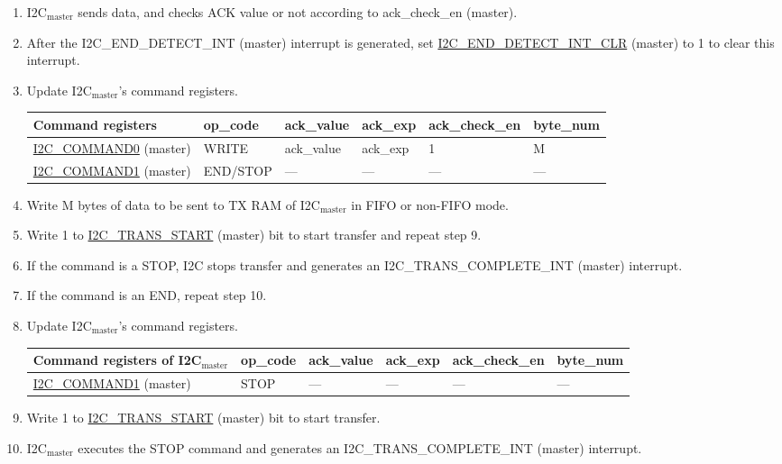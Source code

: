 \documentclass[main\_\_EN.tex]{subfiles}
\begin{document}
\begin{enumerate}
\item I2C$_\text{master}$ sends data, and checks ACK value or not according to ack\_check\_en (master).

\item After the I2C\_END\_DETECT\_INT (master) interrupt is generated, set \hyperref[fielddesc:I2CENDDETECTINTCLR]{I2C\_END\_DETECT\_INT\_CLR} (master) to 1 to clear this interrupt.
\item Update I2C$_\text{master}$'s command registers.
\begin{longtable}{ | p{4cm} | p{2cm} | p{2cm} | p{2cm} |p{2cm} | p{2cm} |}
\hline\rowcolor{lightgray}
Command registers& op\_code & ack\_value&ack\_exp&ack\_check\_en&byte\_num  \\ \hline
\hyperref[fielddesc:I2CCOMMAND0]{I2C\_COMMAND0} (master)& WRITE& ack\_value&ack\_exp&1&M  \\ \hline
\hyperref[fielddesc:I2CCOMMAND1]{I2C\_COMMAND1} (master)& END/STOP& ---&---&---&---  \\ \hline
\end{longtable}
\item Write M bytes of data to be sent to TX RAM of I2C$_\text{master}$ in FIFO or non-FIFO mode.
\item Write 1 to \hyperref[fielddesc:I2CTRANSSTART]{I2C\_TRANS\_START} (master) bit to start transfer and repeat step 9.
\item If the command is a STOP, I2C stops transfer and generates an I2C\_TRANS\_COMPLETE\_INT (master) interrupt.
\item If the command is an END, repeat step 10.
\item Update I2C$_\text{master}$'s command registers.
\begin{longtable}{ | p{4cm} | p{2cm} | p{2cm} | p{2cm} |p{2cm} | p{2cm} |}
\hline\rowcolor{lightgray}
Command registers of I2C$_\text{master}$& op\_code & ack\_value&ack\_exp&ack\_check\_en&byte\_num  \\ \hline
\hyperref[fielddesc:I2CCOMMAND1]{I2C\_COMMAND1} (master)& STOP& ---&---&---&---  \\ \hline
\end{longtable}
\item Write 1 to \hyperref[fielddesc:I2CTRANSSTART]{I2C\_TRANS\_START} (master) bit to start transfer.
\item I2C$_\text{master}$ executes the STOP command and generates an I2C\_TRANS\_COMPLETE\_INT (master) interrupt.

\end{enumerate}
\end{document}
